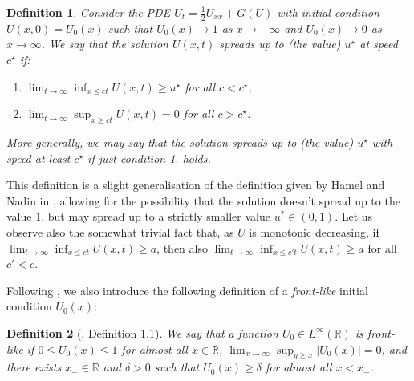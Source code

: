 \documentclass{article}
\newtheorem{defn}{Definition}
\newcommand{\B}[1]{\mathbb{#1}}
\begin{document}
\vspace{1em}

\begin{defn}
    Consider the PDE $U_t = \frac12 U_{xx} + G(U)$ with initial condition $U(x,0)=U_0(x)$ such that $U_0(x)\to 1$ as $x\to-\infty$ and $U_0(x)\to 0$ as $x\to\infty$. We say that the solution $U(x,t)$ \textit{spreads up to (the value) $u^\star$ at speed $c^\star$} if:
    \begin{enumerate}
        \item $\lim_{t\to\infty}\inf_{x\leq ct} U(x,t)\geq u^\star$ for all $c<c^\star$,
        \item $\lim_{t\to\infty}\sup_{x\geq ct} U(x,t)=0$ for all $c>c^\star$.
    \end{enumerate}
    More generally, we may say that the solution \textit{spreads up to (the value) $u^\star$ with speed at least $c^\star$} if just condition 1. holds.
\end{defn}

This definition is a slight generalisation of the definition given by Hamel and Nadin in \cite{hamelNadin}, allowing for the possibility that the solution doesn't spread up to the value $1$, but may spread up to a strictly smaller value $u^*\in (0,1)$. Let us observe also the somewhat trivial fact that, as $U$ is monotonic decreasing, if $\lim_{t\to\infty}\inf_{x\leq ct}U(x,t)\geq a$, then also $\lim_{t\to\infty}\inf_{x\leq c't}U(x,t)\geq a$ for all $c'<c$. 

Following \cite{hamelNadin}, we also introduce the following definition of a \textit{front-like} initial condition $U_0(x)$:

\vspace{1em}

\begin{defn}[\cite{hamelNadin}, Definition 1.1]
    We say that a function $U_0\in L^\infty(\B{R})$ is \textit{front-like} if $0\leq U_0(x)\leq 1$ for almost all $x\in \B{R}$, $\lim_{x\to\infty}\sup_{y\geq x}|U_0(x)|=0$, and there exists $x_-\in \B{R}$ and $\delta>0$ such that $U_0(x)\geq \delta$ for almost all $x<x_-$.
\end{defn}

\vspace{1em}
\end{document}

